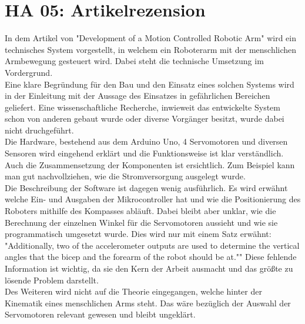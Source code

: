 \section{HA 05: Artikelrezension}
  In dem Artikel von \cite{jiang_development_2017} "Development of a Motion Controlled Robotic Arm" wird ein technisches System vorgestellt, in welchem ein Roboterarm mit der menschlichen Armbewegung gesteuert wird. Dabei steht die technische Umsetzung im Vordergrund.\\
  Eine klare Begründung für den Bau und den Einsatz eines solchen Systems wird in der Einleitung mit der Aussage des Einsatzes in gefährlichen Bereichen geliefert. Eine wissenschaftliche Recherche, inwieweit das entwickelte System schon von anderen gebaut wurde oder diverse Vorgänger besitzt, wurde dabei nicht druchgeführt.\\
  Die Hardware, bestehend aus dem Arduino Uno, 4 Servomotoren und diversen Sensoren wird eingehend erklärt und die Funktionsweise ist klar verständlich. Auch die Zusammensetzung der Komponenten ist ersichtlich. Zum Beispiel kann man gut nachvollziehen, wie die Stromversorgung ausgelegt wurde.\\
  Die Beschreibung der Software ist dagegen wenig ausführlich. Es wird erwähnt welche Ein- und Ausgaben der Mikrocontroller hat und wie die Positionierung des Roboters mithilfe des Kompasses abläuft. Dabei bleibt aber unklar, wie die Berechnung der einzelnen Winkel für die Servomotoren aussieht und wie sie programmatisch umgesetzt wurde. Dies wird nur mit einem Satz erwähnt: "Additionally, two of the accelerometer outputs are used to determine the vertical angles that the bicep and the forearm of the robot should be at."" Diese fehlende Information ist wichtig, da sie den Kern der Arbeit ausmacht und das größte zu lösende Problem darstellt.\\
  Des Weiteren wird nicht auf die Theorie eingegangen, welche hinter der Kinematik eines menschlichen Arms steht. Das wäre bezüglich der Auswahl der Servomotoren relevant gewesen und bleibt ungeklärt.
